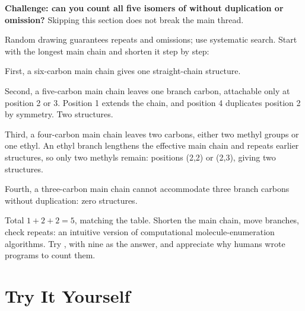 \begin{tiaozhan}
\textbf{Challenge: can you count all five isomers of  without duplication or omission?} Skipping this section does not break the main thread.

Random drawing guarantees repeats and omissions; use systematic search. Start with the longest main chain and shorten it step by step:

First, a six-carbon main chain gives one straight-chain structure.

Second, a five-carbon main chain leaves one branch carbon, attachable only at position 2 or 3. Position 1 extends the chain, and position 4 duplicates position 2 by symmetry. Two structures.

Third, a four-carbon main chain leaves two carbons, either two methyl groups or one ethyl. An ethyl branch lengthens the effective main chain and repeats earlier structures, so only two methyls remain: positions (2,2) or (2,3), giving two structures.

Fourth, a three-carbon main chain cannot accommodate three branch carbons without duplication: zero structures.

Total $1+2+2=5$, matching the table. Shorten the main chain, move branches, check repeats: an intuitive version of computational molecule-enumeration algorithms. Try , with nine as the answer, and appreciate why humans wrote programs to count them.
\end{tiaozhan}

\section*{Try It Yourself}

